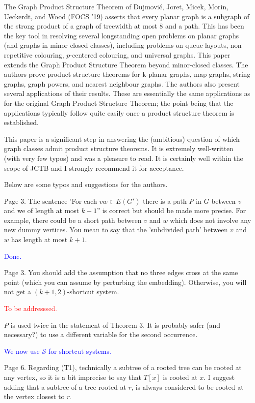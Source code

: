 \documentclass[12pt]{article}
\newcommand{\done}{\textcolor{blue}{Done.}}
\newcommand{\tba}{\textcolor{red}{To be addresssed.}}
\begin{document}
The Graph Product Structure Theorem of Dujmović, Joret,
Micek, Morin, Ueckerdt, and Wood (FOCS '19) asserts that every planar
graph is a subgraph of the strong product of a graph of treewidth at
most 8 and a path.  This has been the key tool in resolving several
longstanding open problems on planar graphs (and graphs in
minor-closed classes), including problems on queue layouts,
non-repetitive colouring, $p$-centered colouring, and universal graphs.
This paper extends the Graph Product Structure Theorem beyond
minor-closed classes.  The authors prove product structure theorems
for k-planar graphs, map graphs, string graphs, graph powers, and
nearest neighbour graphs.   The authors also present several
applications of their results.  These are essentially the same
applications as for the original Graph Product Structure Theorem; the
point being that the applications typically follow quite easily once a
product structure theorem is established.

This paper is a significant step in answering the (ambitious) question
of which graph classes admit product structure theorems. It is
extremely well-written (with very few typos) and was a pleasure to
read.  It is certainly well within the scope of JCTB and I strongly
recommend it for acceptance.

Below are some typos and suggestions for the authors.


Page 3.  The sentence 'For each $vw \in E(G')$ there is a path $P$ in $G$
between $v$ and we of length at most $k+1$'' is correct but should be made
more precise.  For example, there could be a short path between $v$ and
$w$ which does not involve any new dummy vertices.  You mean to say that
the 'subdivided path' between $v$ and $w$ has length at most $k+1$.

\done

Page 3.  You should add the assumption that no three edges cross at
the same point (which you can assume by perturbing the embedding).
Otherwise, you will not get a $(k+1, 2)$-shortcut system.

\tba

$P$ is used twice in the statement of Theorem 3.  It is probably
safer (and necessary?) to use a different variable for the second
occurrence.

\textcolor{blue}{We now use $\mathcal{S}$ for shortcut systems.}

Page 6. Regarding (T1), technically a subtree of a rooted tree can be
rooted at any vertex, so it is a bit imprecise to say that $T[x]$ is
rooted at $x$.  I suggest adding that a subtree of a tree rooted at $r$,
is always considered to be rooted at the vertex closest to $r$.
\end{document}
